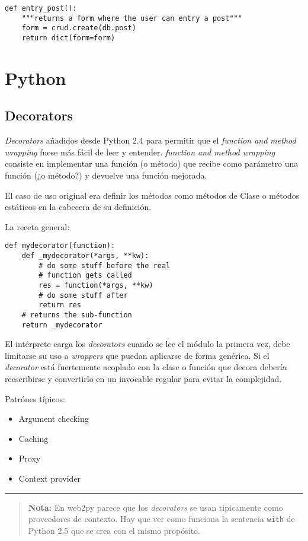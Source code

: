 \documentclass[12pt,spanish,]{article}
\providecommand{\tightlist}{%
  \setlength{\itemsep}{0pt}\setlength{\parskip}{0pt}}
\begin{document}
\begin{verbatim}
def entry_post():
    """returns a form where the user can entry a post"""
    form = crud.create(db.post)
    return dict(form=form)
\end{verbatim}

\section{Python}\label{python}

\subsection{Decorators}\label{decorators}

\emph{Decorators} añadidos desde Python 2.4 para permitir que el
\emph{function and method wrapping} fuese más fácil de leer y entender.
\emph{function and method wrapping} consiste en implementar una función
(o método) que recibe como parámetro una función (¿o método?) y devuelve
una función mejorada.

El caso de uso original era definir los métodos como métodos de Clase o
métodos estáticos en la cabecera de su definición.

La receta general:

\begin{verbatim}
def mydecorator(function):
    def _mydecorator(*args, **kw):
        # do some stuff before the real 
        # function gets called 
        res = function(*args, **kw)
        # do some stuff after
        return res
    # returns the sub-function
    return _mydecorator
\end{verbatim}

El intérprete carga los \emph{decorators} cuando se lee el módulo la
primera vez, debe limitarse su uso a \emph{wrappers} que puedan
aplicarse de forma genérica. Si el \emph{decorator} está fuertemente
acoplado con la clase o función que decora debería reescribirse y
convertirlo en un invocable regular para evitar la complejidad.

Patrónes típicos:

\begin{itemize}
\tightlist
\item
  Argument checking
\item
  Caching
\item
  Proxy
\item
  Context provider
\end{itemize}

\begin{center}\rule{0.5\linewidth}{\linethickness}\end{center}

\begin{quote}
\textbf{Nota:} En web2py parece que los \emph{decorators} se usan
tipicamente como proveedores de contexto. Hay que ver como funciona la
sentencia \texttt{with} de Python 2.5 que se crea con el mismo
propósito.
\end{quote}
\end{document}
